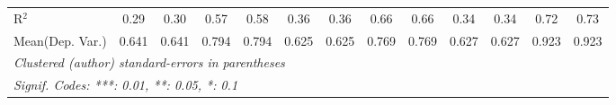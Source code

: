 \begin{tabular}{lcccccccccccc}
   R$^2$                                    & 0.29          & 0.30           & 0.57          & 0.58          & 0.36          & 0.36          & 0.66        & 0.66    & 0.34          & 0.34           & 0.72    & 0.73\\  
Mean(Dep. Var.) & 0.641 & 0.641 & 0.794 & 0.794 & 0.625 & 0.625 & 0.769 & 0.769 & 0.627 & 0.627 & 0.923 & 0.923 \\
   \midrule \midrule
   \multicolumn{13}{l}{\emph{Clustered (author) standard-errors in parentheses}}\\
   \multicolumn{13}{l}{\emph{Signif. Codes: ***: 0.01, **: 0.05, *: 0.1}}\\
\end{tabular}
\par\endgroup
